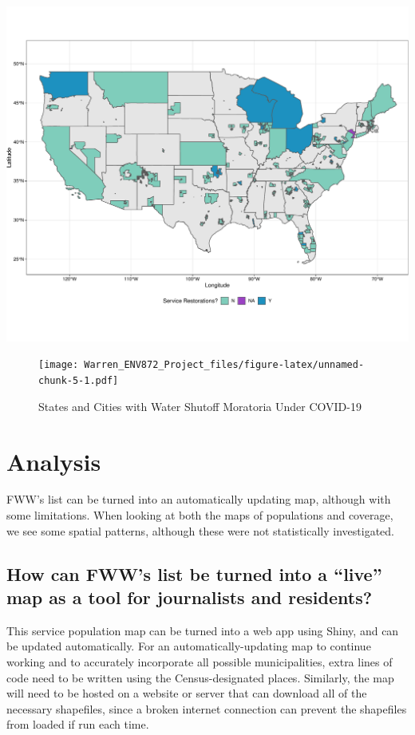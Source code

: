 \documentclass[
  12pt,
]{article}
\begin{document}
\includegraphics{Warren_ENV872_Project_files/figure-latex/unnamed-chunk-3-1.pdf}

\begin{figure}
\centering
\texttt{[image: Warren\_ENV872\_Project\_files/figure-latex/unnamed-chunk-5-1.pdf]}
\caption{States and Cities with Water Shutoff Moratoria Under COVID-19}
\end{figure}

\newpage

\hypertarget{analysis}{%
\section{Analysis}\label{analysis}}

FWW's list can be turned into an automatically updating map, although
with some limitations. When looking at both the maps of populations and
coverage, we see some spatial patterns, although these were not
statistically investigated.

\hypertarget{how-can-fwws-list-be-turned-into-a-live-map-as-a-tool-for-journalists-and-residents}{%
\subsection{How can FWW's list be turned into a ``live'' map as a tool
for journalists and
residents?}\label{how-can-fwws-list-be-turned-into-a-live-map-as-a-tool-for-journalists-and-residents}}

This service population map can be turned into a web app using Shiny,
and can be updated automatically. For an automatically-updating map to
continue working and to accurately incorporate all possible
municipalities, extra lines of code need to be written using the
Census-designated places. Similarly, the map will need to be hosted on a
website or server that can download all of the necessary shapefiles,
since a broken internet connection can prevent the shapefiles from
loaded if run each time.
\end{document}
